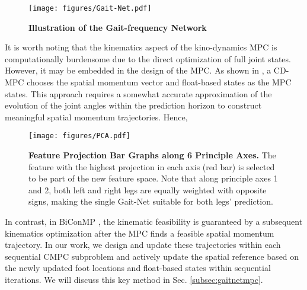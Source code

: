 \begin{figure}[!t]
\vspace{0.2cm}
    \center
    \texttt{[image: figures/Gait-Net.pdf]}
    \caption{{\bfseries Illustration of the Gait-frequency Network}}
    \label{fig:gaitnet}
    \vspace{-0.5cm}
\end{figure}


It is worth noting that the kinematics aspect of the kino-dynamics MPC is computationally burdensome due to the direct optimization of full joint states. However, it may be embedded in the design of the MPC. As shown in \cite{dantec2024centroidal}, a CD-MPC chooses the spatial momentum vector and float-based states as the MPC states. This approach requires a somewhat accurate approximation of the evolution of the joint angles within the prediction horizon to construct meaningful spatial momentum trajectories. Hence,

\begin{figure*}[!t]
\vspace{0.2cm}
    \center
    \texttt{[image: figures/PCA.pdf]}
    \caption{{\bfseries Feature Projection Bar Graphs along 6 Principle Axes.} The feature with the highest projection in each axis (red bar) is selected to be part of the new feature space. Note that along principle axes 1 and 2, both left and right legs are equally weighted with opposite signs, making the single Gait-Net suitable for both legs' prediction. }
    \label{fig:PCA}
    \vspace{-0.2cm}
\end{figure*}

In contrast, in BiConMP \cite{meduri2023biconmp}, the kinematic feasibility is guaranteed by a subsequent kinematics optimization after the MPC finds a feasible spatial momentum trajectory. In our work, we design and update these trajectories within each sequential CMPC subproblem and actively update the spatial reference based on the newly updated foot locations and float-based states within sequential iterations. We will discuss this key method in Sec. \ref{subsec:gaitnetmpc}. 